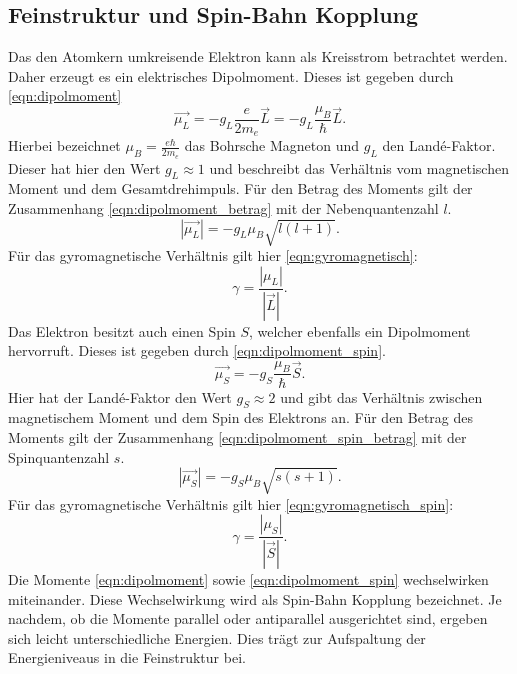 \subsection{Feinstruktur und Spin-Bahn Kopplung}
\label{subsec:feinstruktur}
Das den Atomkern umkreisende Elektron kann als Kreisstrom betrachtet werden.
Daher erzeugt es ein elektrisches Dipolmoment. Dieses ist gegeben durch
\ref{eqn:dipolmoment}
\begin{equation}
  \vec{\mu_{L}} = -g_{L} \frac{e}{2m_{e}}\vec{L} = -g_{L}\frac{\mu_{B}}{\hbar} \vec{L}.
  \label{eqn:dipolmoment}
\end{equation}
Hierbei bezeichnet $\mu_{B} = \frac{e \hbar}{2m_{e}}$ das Bohrsche Magneton und $g_{L}$
den Land\'e-Faktor. Dieser hat hier den Wert $g_{L} \approx 1$ und beschreibt das
Verhältnis vom magnetischen Moment und dem Gesamtdrehimpuls.
Für den Betrag des Moments gilt der Zusammenhang
\ref{eqn:dipolmoment_betrag} mit der Nebenquantenzahl $l$.
\begin{equation}
  |\vec{\mu_{L}}| = - g_{L}\mu_{B} \sqrt{l(l+1)}.
  \label{eqn:dipolmoment_betrag}
\end{equation}
Für das gyromagnetische Verhältnis gilt hier \ref{eqn:gyromagnetisch}:
\begin{equation}
  \gamma = \frac{|\mu_{L}|}{|\vec{L}|}.
  \label{eqn:gyromagnetisch}
\end{equation}
Das Elektron besitzt auch einen Spin $S$, welcher ebenfalls ein Dipolmoment
hervorruft. Dieses ist gegeben durch \ref{eqn:dipolmoment_spin}.
\begin{equation}
  \vec{\mu_{S}} = -g_{S} \frac{\mu_{B}}{\hbar} \vec{S}.
  \label{eqn:dipolmoment_spin}
\end{equation}
Hier hat der Land\'e-Faktor den Wert $g_{S} \approx 2$ und gibt das Verhältnis
zwischen magnetischem Moment und dem Spin des Elektrons an.
Für den Betrag des Moments gilt der Zusammenhang
\ref{eqn:dipolmoment_spin_betrag} mit der Spinquantenzahl $s$.
\begin{equation}
  |\vec{\mu_{S}}| = - g_{S}\mu_{B} \sqrt{s(s+1)}.
  \label{eqn:dipolmoment_spin_betrag}
\end{equation}
Für das gyromagnetische Verhältnis gilt hier \ref{eqn:gyromagnetisch_spin}:
\begin{equation}
  \gamma = \frac{|\mu_{S}|}{|\vec{S}|}.
  \label{eqn:gyromagnetisch_spin}
\end{equation}
Die Momente \ref{eqn:dipolmoment} sowie \ref{eqn:dipolmoment_spin}
wechselwirken miteinander. Diese Wechselwirkung wird als Spin-Bahn Kopplung
bezeichnet. Je nachdem, ob die Momente parallel oder antiparallel ausgerichtet
sind, ergeben sich leicht unterschiedliche Energien. Dies trägt zur Aufspaltung
der Energieniveaus in die Feinstruktur bei.

